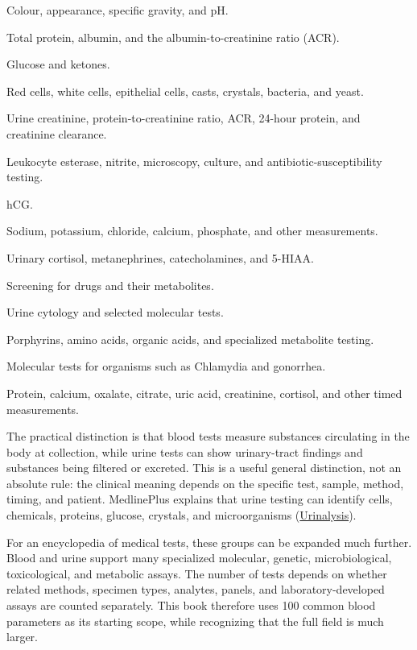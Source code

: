 \documentclass[11pt,openany]{book}
\begin{document}
\begin{description}[leftmargin=3.2cm,style=nextline]
  \item[Routine urinalysis] Colour, appearance, specific gravity, and pH.
  \item[Protein] Total protein, albumin, and the albumin-to-creatinine ratio (ACR).
  \item[Glucose and metabolism] Glucose and ketones.
  \item[Microscopy] Red cells, white cells, epithelial cells, casts, crystals, bacteria, and yeast.
  \item[Kidney assessment] Urine creatinine, protein-to-creatinine ratio, ACR, 24-hour protein, and creatinine clearance.
  \item[Urinary infection] Leukocyte esterase, nitrite, microscopy, culture, and antibiotic-susceptibility testing.
  \item[Pregnancy] hCG.
  \item[Electrolytes] Sodium, potassium, chloride, calcium, phosphate, and other measurements.
  \item[Endocrine] Urinary cortisol, metanephrines, catecholamines, and 5-HIAA.
  \item[Toxicology] Screening for drugs and their metabolites.
  \item[Cancer and urology] Urine cytology and selected molecular tests.
  \item[Metabolic disorders] Porphyrins, amino acids, organic acids, and specialized metabolite testing.
  \item[STIs and infections] Molecular tests for organisms such as Chlamydia and gonorrhea.
  \item[24-hour urine studies] Protein, calcium, oxalate, citrate, uric acid, creatinine, cortisol, and other timed measurements.
\end{description}

The practical distinction is that blood tests measure substances circulating in
the body at collection, while urine tests can show urinary-tract findings and
substances being filtered or excreted. This is a useful general distinction,
not an absolute rule: the clinical meaning depends on the specific test,
sample, method, timing, and patient. MedlinePlus explains that urine testing
can identify cells, chemicals, proteins, glucose, crystals, and microorganisms
(\href{https://medlineplus.gov/ency/article/003579.htm}{Urinalysis}).

For an encyclopedia of medical tests, these groups can be expanded much
further. Blood and urine support many specialized molecular, genetic,
microbiological, toxicological, and metabolic assays. The number of tests
depends on whether related methods, specimen types, analytes, panels, and
laboratory-developed assays are counted separately. This book therefore uses
100 common blood parameters as its starting scope, while recognizing that the
full field is much larger.
\end{document}

